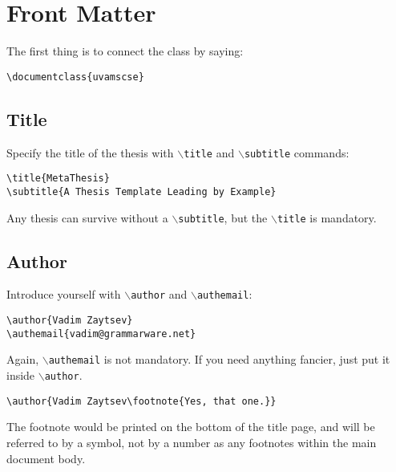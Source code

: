 \documentclass{uvamscse}
\newcommand{\cmd}[1]{\texttt{$\backslash$#1}}
\begin{document}
\chapter{Front Matter}

The first thing is to connect the class by saying:

\begin{snippet}
\begin{verbatim}
\documentclass{uvamscse}
\end{verbatim}
\end{snippet}

\section{Title}

Specify the title of the thesis with \cmd{title} and \cmd{subtitle} commands:

\begin{snippet}
\begin{verbatim}
\title{MetaThesis}
\subtitle{A Thesis Template Leading by Example}
\end{verbatim}
\end{snippet}

Any thesis can survive without a \cmd{subtitle}, but the \cmd{title} is mandatory.

\section{Author}

Introduce yourself with \cmd{author} and \cmd{authemail}:

\begin{snippet}
\begin{verbatim}
\author{Vadim Zaytsev}
\authemail{vadim@grammarware.net}
\end{verbatim}
\end{snippet}

Again, \cmd{authemail} is not mandatory. If you need anything fancier, just put it inside \cmd{author}.

\begin{snippet}
\begin{verbatim}
\author{Vadim Zaytsev\footnote{Yes, that one.}}
\end{verbatim}
\end{snippet}

The footnote would be printed on the bottom of the title page, and will be
referred to by a symbol, not by a number as any footnotes within the main
document body.
\end{document}
